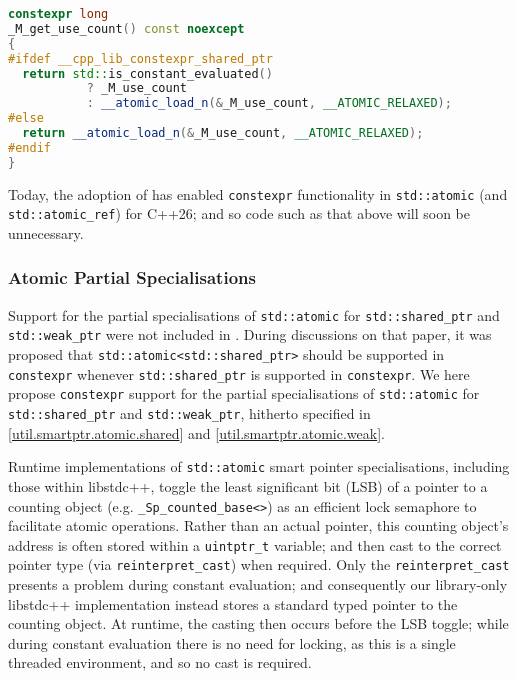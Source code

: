 \documentclass[10pt]{article}
\newcommand*{\wgxxi}[1]{[\href{https://wg21.link/#1}{#1}]}
\begin{document}

\begin{lstlisting}[language=cpp]
constexpr long
_M_get_use_count() const noexcept
{
#ifdef __cpp_lib_constexpr_shared_ptr
  return std::is_constant_evaluated()
           ? _M_use_count
           : __atomic_load_n(&_M_use_count, __ATOMIC_RELAXED);
#else
  return __atomic_load_n(&_M_use_count, __ATOMIC_RELAXED);
#endif
}
\end{lstlisting}

Today, the adoption of \cite{P3309R3} has enabled \texttt{constexpr}
functionality in \texttt{std::atomic} (and \texttt{std::atomic\_ref}) for
C++26; and so code such as that above will soon be unnecessary.

\subsubsection{Atomic Partial Specialisations}
\label{sec:atom_spec}

Support for the partial specialisations of \texttt{std::atomic} for
\texttt{std::shared\_ptr} and \texttt{std::weak\_ptr} were not included in
\cite{P3309R3}. During discussions on that paper, it was proposed that
\texttt{std::atomic<std::shared\_ptr>} should be supported in
\texttt{constexpr} whenever \texttt{std::shared\_ptr} is supported in
\texttt{constexpr}. We here propose \texttt{constexpr} support for the partial
specialisations of \texttt{std::atomic} for \texttt{std::shared\_ptr} and
\texttt{std::weak\_ptr}, hitherto specified in
\wgxxi{util.smartptr.atomic.shared} and \wgxxi{util.smartptr.atomic.weak}.

Runtime implementations of \texttt{std::atomic} smart pointer specialisations,
including those within libstdc++, toggle the least
significant bit (LSB) of a pointer to a counting object (e.g.
\texttt{\_Sp\_counted\_base<>}) as an efficient lock semaphore to facilitate
atomic operations. Rather than an actual pointer, this counting object's
address is often stored within a \texttt{uintptr\_t} variable; and then cast to
the correct pointer type (via \texttt{reinterpret\_cast}) when required. Only
the \texttt{reinterpret\_cast} presents a problem during constant evaluation;
and consequently our library-only libstdc++ implementation instead stores a
standard typed pointer to the counting object. At runtime, the casting then
occurs before the LSB toggle; while during constant evaluation there is no need
for locking, as this is a single threaded environment, and so no cast is
required.
\end{document}
